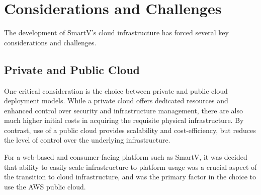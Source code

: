 \section{Considerations and Challenges}

The development of SmartV's cloud infrastructure has forced several key considerations and challenges.

\subsection{Private and Public Cloud}

One critical consideration is the choice between private and public cloud deployment models. While a private cloud offers dedicated resources and enhanced control over security and infrastructure management, there are also much higher initial costs in acquiring the requisite physical infrastructure. By contrast, use of a public cloud provides scalability and cost-efficiency, but reduces the level of control over the underlying infrastructure.

For a web-based and consumer-facing platform such as SmartV, it was decided that ability to easily scale infrastructure to platform usage was a crucial aspect of the transition to cloud infrastructure, and was the primary factor in the choice to use the AWS public cloud.